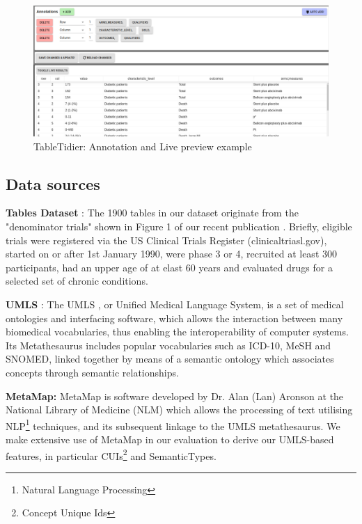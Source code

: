 \documentclass[10.7pt,]{article}
\begin{document}
\begin{figure}
	\centering
	\includegraphics[width=\linewidth]{../resources/screenshot004}
	\caption{TableTidier: Annotation and Live preview example}
	\label{fig:annotationPreview}
\end{figure}

\subsection{Data sources}\label{data-sources}
	
	
\textbf{Tables Dataset} : The 1900 tables in our dataset originate from the "denominator trials" shown in Figure 1 of our recent publication \cite{Hanlon2019}. Briefly, eligible trials were registered via the US Clinical Trials Register (clinicaltriasl.gov), started on or after 1st January 1990, were phase 3 or 4, recruited at least 300 participants, had an upper age of at elast 60 years and evaluated drugs for a selected set of chronic conditions.

\textbf{UMLS} : The UMLS \cite{10.1093/nar/gkh061}, or Unified Medical Language System, is a set of medical ontologies and interfacing software, which allows the interaction between many biomedical vocabularies, thus enabling the interoperability of computer systems. Its Metathesaurus includes popular vocabularies such as ICD-10, MeSH and SNOMED, linked together by means of a semantic ontology which associates concepts through semantic relationships.

\textbf{MetaMap: } MetaMap \cite{10.1136/jamia.2009.002733} is software developed by Dr. Alan (Lan) Aronson at the National Library of Medicine (NLM) which allows the processing of text utilising NLP\footnote{Natural Language Processing} techniques, and its subsequent linkage to the UMLS metathesaurus. We make extensive use of MetaMap in our evaluation to derive our UMLS-based features, in particular CUIs\footnote{Concept Unique Ids} and SemanticTypes\cite{semtypes}.
\end{document}
